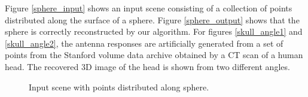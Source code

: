 \documentclass[twocolumn]{article}
\begin{document}
Figure \ref{sphere_input} shows an input scene consisting of a collection of points distributed along the surface of a sphere. Figure \ref{sphere_output} shows that the sphere is correctly reconstructed by our algorithm. For figures \ref{skull_angle1} and \ref{skull_angle2}, the antenna responses are artificially generated from a set of points from the Stanford volume data archive obtained by a CT scan of a human head. The recovered 3D image of the head is shown from two different angles.

\begin{figure}
\begin{centering}

	
\end{centering}
\caption{Input scene with points distributed along sphere.}
\end{figure}
\end{document}
